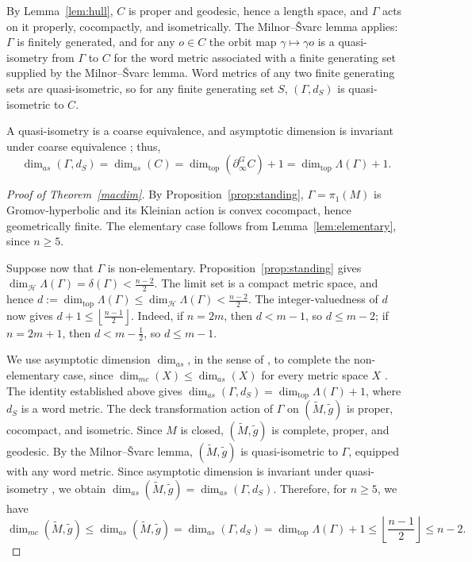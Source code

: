 \documentclass[12pt,oneside,a4paper]{article}
\theoremstyle{mytheorem}
\theoremstyle{remark}
\theoremstyle{definition}
\begin{document}
By Lemma~\ref{lem:hull}, \(C\) is proper and geodesic, hence a length
space, and \(\Gamma\) acts on it properly, cocompactly, and
isometrically. The Milnor--\v{S}varc lemma applies: \(\Gamma\)
is finitely generated, and for any \(o\in C\) the orbit map
\(\gamma\mapsto\gamma o\) is a quasi-isometry from \(\Gamma\) to \(C\) for the word
metric associated with a finite generating set supplied by the
Milnor--\v{S}varc lemma. Word metrics of any two finite generating sets are
quasi-isometric, so for any finite generating set \(S\), $(\Gamma,d_S)$ is
quasi-isometric to $C$.


A quasi-isometry is a coarse equivalence, and asymptotic dimension is
invariant under coarse equivalence \cite[Proposition~22]{zbMATH05292205}; thus,
\[
\dim_{as}(\Gamma,d_S)=
\dim_{as}(C)
=
\dim_{\mathrm{top}}(\partial_\infty^{G}C)+1
=
\dim_{\mathrm{top}}\Lambda(\Gamma)+1.
\]

\begin{proof}[Proof of Theorem~\ref{macdim}]
By Proposition~\ref{prop:standing}, $\Gamma=\pi_1(M)$ is Gromov-hyperbolic
and its Kleinian action is convex cocompact, hence geometrically finite. The
elementary case follows from Lemma~\ref{lem:elementary}, since $n\geq5$.

Suppose now that $\Gamma$ is non-elementary. Proposition~\ref{prop:standing}
gives
$\dim_{\mathcal H}\Lambda(\Gamma)=\delta(\Gamma)<\frac{n-2}{2}$.
The limit set is a compact metric space, and hence
$d:=\dim_{\mathrm{top}}\Lambda(\Gamma)
\leq\dim_{\mathcal H}\Lambda(\Gamma)<\frac{n-2}{2}$.
The integer-valuedness of $d$ now gives
$d+1\leq\left\lfloor\frac{n-1}{2}\right\rfloor$.
Indeed, if $n=2m$, then $d<m-1$, so $d\leq m-2$; if $n=2m+1$,
then $d<m-\frac12$, so $d\leq m-1$.

We use asymptotic dimension $\dim_{as}$, in the sense of
\cite{zbMATH05292205}, to complete the non-elementary case, since
$\dim_{mc}(X)\leq \dim_{as}(X)$ for every metric space $X$
\cite[p.~230]{zbMATH06371564}. The identity established above gives
$\dim_{as}(\Gamma,d_S)=\dim_{\mathrm{top}}\Lambda(\Gamma)+1$,
where $d_S$ is a word metric.
The deck transformation action of $\Gamma$ on
$(\widetilde M,\widetilde g)$ is proper, cocompact, and isometric. Since
$M$ is closed, $(\widetilde M,\widetilde g)$ is complete, proper, and
geodesic. By the Milnor--\v{S}varc lemma,
$(\widetilde M,\widetilde g)$ is quasi-isometric to $\Gamma$, equipped with
any word metric. Since asymptotic dimension is invariant under
quasi-isometry \cite[Proposition~22]{zbMATH05292205}, we obtain
$\dim_{as}(\widetilde M,\widetilde g)=\dim_{as}(\Gamma,d_S).$ Therefore,
for $n\geq5$, we have
\[
\dim_{mc}(\widetilde M,\widetilde g)
\leq
\dim_{as}(\widetilde M,\widetilde g)
=
\dim_{as}(\Gamma,d_S)
=
\dim_{\mathrm{top}}\Lambda(\Gamma)+1
\leq
\left\lfloor\frac{n-1}{2}\right\rfloor
\leq
n-2.
\]
\end{proof}
\end{document}
